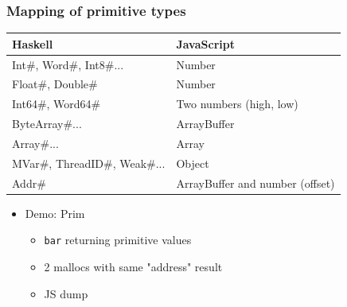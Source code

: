 \documentclass[aspectratio=169]{beamer}
\begin{document}
\begin{frame}
  \frametitle{Mapping of primitive types}
  \begin{tabular}{ll}
    \hline
    Haskell & JavaScript \\ \hline
    Int\#, Word\#, Int8\#... & Number \\
    Float\#, Double\#        & Number\\
    Int64\#, Word64\#        & Two numbers (high, low) \\
    ByteArray\#...           & ArrayBuffer\\
    Array\#...               & Array\\
    MVar\#, ThreadID\#, Weak\#... & Object\\
    Addr\#                   & \alert{ArrayBuffer and number (offset)}\\
  \end{tabular}
  \hspace{1cm}
  \begin{itemize}
    \item Demo: Prim
      \begin{itemize}
        \item \texttt{bar} returning primitive values
        \item 2 mallocs with same "address" result
        \item JS dump
      \end{itemize}
  \end{itemize}
\end{frame}
\end{document}
